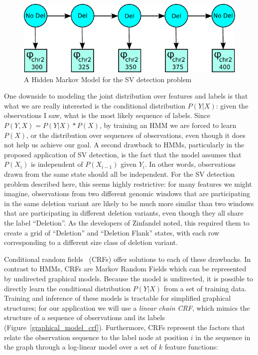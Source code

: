 \begin{figure}
\centering
\includegraphics[width=.8\textwidth]{figures/graphical-model-1.pdf}
\caption{A Hidden Markov Model for the SV detection problem}
\label{graphical_model_hmm}
\end{figure}

One downside to modeling the joint distribution over features and labels is that what we are really interested is the conditional distribution $P(Y|X)$: given the observations I saw, what is the most likely sequence of labels. Since $P(Y,X) = P(Y|X) * P(X)$, by training an HMM we are forced to learn $P(X)$, or the distribution over sequences of observations, even though it does not help us achieve our goal. A second drawback to HMMs, particularly in the proposed application of SV detection, is the fact that the model assumes that $P(X_i)$ is independent of $P(X_{i-1})$ given $Y_i$. In other words, observations drawn from the same state should all be independent. For the SV detection problem described here, this seems highly restrictive: for many features we might imagine, observations from two different genomic windows that are participating in the same deletion variant are likely to be much more similar than two windows that are participating in different deletion variants, even though they all share the label ``Deletion''. As the developers of Zinfandel noted, this required them to create a grid of ``Deletion'' and ``Deletion Flank'' states, with each row corresponding to a different size class of deletion variant.

Conditional random fields~\cite{Lafferty:2001:CRF:645530.655813} (CRFs) offer solutions to each of these drawbacks. In contrast to HMMs, CRFs are Markov Random Fields which can be represented by undirected graphical models. Because the model is undirected, it is possible to directly learn the conditional distribution $P(Y|X)$ from a set of training data. Training and inference of these models is tractable for simplified graphical structures; for our application we will use a \emph{linear chain CRF}, which mimics the structure of a sequence of observations and its labels (Figure~\ref{graphical_model_crf}). Furthermore, CRFs represent the factors that relate the observation sequence to the label node at position $i$ in the sequence in the graph through a log-linear model over a set of $k$ feature functions:

